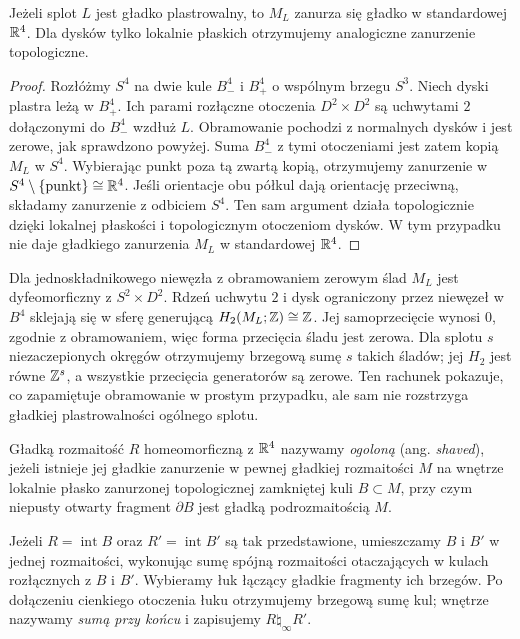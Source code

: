 \begin{stwierdzenie}
\label{prop:egzotyczne-r4-slice-trace}
Jeżeli splot $L$ jest gładko plastrowalny,
to $M_L$ zanurza się gładko w standardowej
$\mathbb{R}^4$. Dla dysków tylko lokalnie płaskich
otrzymujemy analogiczne zanurzenie topologiczne.
\end{stwierdzenie}
\begin{proof}
Rozłóżmy $S^4$ na dwie kule $B^4_-$ i $B^4_+$
o wspólnym brzegu $S^3$. Niech dyski plastra leżą
w $B^4_+$. Ich parami rozłączne otoczenia
$D^2\times D^2$ są uchwytami $2$ dołączonymi do
$B^4_-$ wzdłuż $L$. Obramowanie pochodzi z
normalnych dysków i jest zerowe, jak sprawdzono
powyżej. Suma $B^4_-$ z tymi otoczeniami jest
zatem kopią $M_L$ w $S^4$. Wybierając punkt poza
tą zwartą kopią, otrzymujemy zanurzenie w
$S^4\setminus\{\mathrm{punkt}\}\cong\mathbb{R}^4$.
Jeśli orientacje obu półkul dają orientację
przeciwną, składamy zanurzenie z odbiciem $S^4$.
Ten sam argument działa topologicznie dzięki
lokalnej płaskości i topologicznym otoczeniom
dysków. W tym przypadku nie daje gładkiego
zanurzenia $M_L$ w standardowej $\mathbb{R}^4$.
\end{proof}

\begin{przyklad}
\label{prz:egzotyczne-r4-unlink}
Dla jednoskładnikowego niewęzła z obramowaniem
zerowym ślad $M_L$ jest dyfeomorficzny z
$S^2\times D^2$. Rdzeń uchwytu $2$ i dysk
ograniczony przez niewęzeł w $B^4$ sklejają się
w sferę generującą $H_2(M_L;\mathbb{Z})\cong\mathbb{Z}$.
Jej samoprzecięcie wynosi $0$, zgodnie z
obramowaniem, więc forma przecięcia śladu jest
zerowa. Dla splotu $s$ niezaczepionych okręgów
otrzymujemy brzegową sumę $s$ takich śladów;
jej $H_2$ jest równe $\mathbb{Z}^s$, a wszystkie
przecięcia generatorów są zerowe. Ten rachunek
pokazuje, co zapamiętuje obramowanie w prostym
przypadku, ale sam nie rozstrzyga gładkiej
plastrowalności ogólnego splotu.
\end{przyklad}

\begin{definicja}
\label{def:egzotyczne-r4-shaved}
Gładką rozmaitość $R$ homeomorficzną z $\mathbb{R}^4$
nazywamy \emph{ogoloną} (ang. \emph{shaved}),
jeżeli istnieje jej
gładkie zanurzenie w pewnej gładkiej rozmaitości
$M$ na wnętrze lokalnie płasko zanurzonej
topologicznej zamkniętej kuli $B\subset M$, przy
czym niepusty otwarty fragment $\partial B$ jest
gładką podrozmaitością $M$.

Jeżeli $R=\operatorname{int}B$ oraz
$R'=\operatorname{int}B'$ są tak przedstawione,
umieszczamy $B$ i $B'$ w jednej rozmaitości,
wykonując sumę spójną rozmaitości otaczających
w kulach rozłącznych z $B$ i $B'$.
Wybieramy łuk łączący gładkie fragmenty ich
brzegów. Po dołączeniu cienkiego otoczenia łuku
otrzymujemy brzegową sumę kul; wnętrze nazywamy
\emph{sumą przy końcu} i zapisujemy
$R\mathbin{\natural_\infty}R'$.
\end{definicja}

